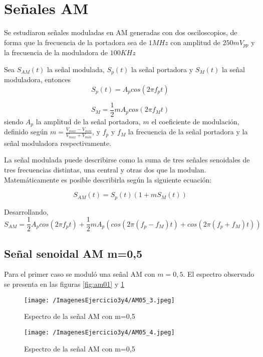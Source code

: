 \section{Señales AM}
Se estudiaron señales moduladas en AM generadas con dos osciloscopios, de forma que la frecuencia de la portadora sea de $1MHz$ con amplitud de $250 mV_{pp}$ y la frecuencia de la moduladora de $100 KHz$

Sea $S_{AM}(t)$ la señal modulada, $S_p(t)$ la señal portadora y $S_M(t)$ la señal moduladora, entonces 
\begin{equation}
    S_p(t)=A_pcos(2\pi f_pt)
\label{eq:Sp}
\end{equation}

\begin{equation}
    S_M=\frac{1}{2}mA_pcos(2\pi f_Mt)
\label{eq:Sm}
\end{equation}
siendo $A_p$ la amplitud de la señal portadora, $m$ el coeficiente de modulación, definido según $m=\frac{V_{max}-V_{min}}{V_{max}+V_{min}}$, y $f_p$ y $f_M$ la frecuencia de la señal portadora y la señal moduladora respectivamente.

La señal modulada puede describirse como la suma de tres señales senoidales de tres frecuencias distintas, una central y otras dos que la modulan. Matemáticamente es posible describirla según la siguiente ecuación:

\begin{equation}
    S_{AM}(t)=S_p(t)(1+mS_M(t))
    \label{eq:sam2}
\end{equation}

Desarrollando,
\begin{equation}
    S_{AM}=\frac{1}{2}A_pcos(2\pi f_pt)+\frac{1}{2}mA_p(cos(2\pi (f_p-f_M)t)+cos(2\pi (f_p+f_M)t))
    \label{eq:Sam}
\end{equation}

\subsection{Señal senoidal AM m=0,5}

Para el primer caso se moduló una señal AM con $m=0,5$. El espectro observado se presenta en las figuras \ref{fig:am01} y \ref{fig:am02}

\begin{figure}[H]
  \centering
  \begin{minipage}[b]{0.6\textwidth}
    \texttt{[image: /ImagenesEjercicio3y4/AM05\_3.jpeg]}
    \caption{Espectro de la señal AM con m=0,5}
    \label{fig:am01}
  \end{minipage}
  \hfill
  \begin{minipage}[b]{0.6\textwidth}
    \texttt{[image: /ImagenesEjercicio3y4/AM05\_4.jpeg]}
    \caption{Espectro de la señal AM con m=0,5}
    \label{fig:am02}
  \end{minipage}
\end{figure}

